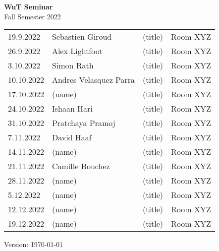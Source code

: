 \documentclass[12pt]{article}
\begin{document}
\centering

{\Huge \bf WuT Seminar}\\[1cm]
{\Large Fall Semester 2022}\\[1.8cm]





\renewcommand*\arraystretch{1.4}
\begin{tabular}{l p{3.8cm} p{8.5cm} p{2cm}}

19.9.2022
 	& Sebastien Giroud
 	& (title)
  & Room XYZ\\
  
26.9.2022
 	& Alex Lightfoot
 	& (title)
 	& Room XYZ\\

3.10.2022
 	& Simon Rath
 	& (title)
 	& Room XYZ\\

10.10.2022
 	& Andres Velasquez Parra
 	& (title)
 	& Room XYZ\\

17.10.2022
 	& (name)
 	& (title)
 	& Room XYZ\\
 	
24.10.2022
 	& Ishaan Hari
 	& (title)
 	& Room XYZ\\

31.10.2022
 	& Pratchaya Pramoj
 	& (title)
 	& Room XYZ\\

7.11.2022
 	& David Haaf
 	& (title)
 	& Room XYZ\\

14.11.2022
 	& (name)
 	& (title)
 	& Room XYZ\\

21.11.2022
 	& Camille Bouchez
 	& (title)
 	& Room XYZ\\

28.11.2022
 	& (name)
 	& (title)
 	& Room XYZ\\

5.12.2022
 	& (name)
 	& (title)
 	& Room XYZ\\

12.12.2022
 	& (name)
 	& (title)
 	& Room XYZ\\

19.12.2022
 	& (name)
 	& (title)
 	& Room XYZ\\


\end{tabular}

\vfill

{\scriptsize Version: \today}
\end{document}

